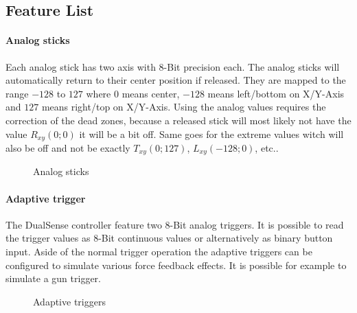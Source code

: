 \subsection{Feature List}

\paragraph{Analog sticks}
Each analog stick has two axis with 8-Bit precision each. The analog sticks will automatically return to their center position if released. They are mapped to the range $-128$ to $127$ where $0$ means center, $-128$ means left/bottom on X/Y-Axis and $127$ means right/top on X/Y-Axis. Using the analog values requires the correction of the dead zones, because a released stick will most likely not have the value $R_{xy}(0; 0)$ it will be a bit off. Same goes for the extreme values witch will also be off and not be exactly $T_{xy}(0; 127)$, $L_{xy}(-128; 0)$, etc..
\begin{figure}[H]
    \centering
    \caption{Analog sticks}
\end{figure}

\paragraph{Adaptive trigger}
The DualSense controller feature two 8-Bit analog triggers. It is possible to read the trigger values as 8-Bit continuous values or alternatively as binary button input. Aside of the normal trigger operation the adaptive triggers can be configured to simulate various force feedback effects. It is possible for example to simulate a gun trigger.
\begin{figure}[H]
    \centering
    \caption{Adaptive triggers}
\end{figure}

